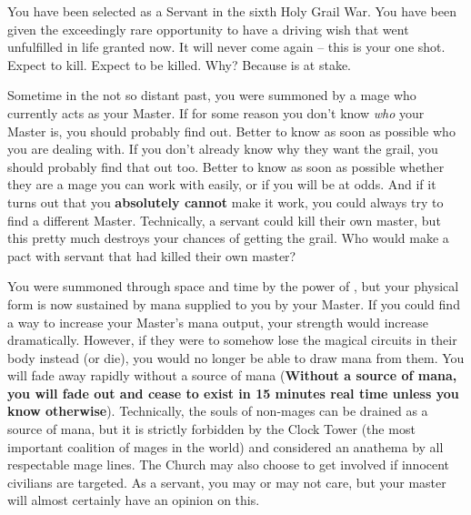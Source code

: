 \documentclass[blue]{FateDarkDawn}
\begin{document}
\name{\bServant{}}

You have been selected as a Servant in the sixth Holy Grail War. You have been given the exceedingly rare opportunity to have a driving wish that went unfulfilled in life granted now. It will never come again -- this is your one shot. Expect to kill. Expect to be killed. Why? Because \iGrail{} is at stake.

Sometime in the not so distant past, you were summoned by a mage who currently acts as your Master. If for some reason you don't know \emph{who} your Master is, you should probably find out. Better to know as soon as possible who you are dealing with. If you don't already know why they want the grail, you should probably find that out too. Better to know as soon as possible whether they are a mage you can work with easily, or if you will be at odds. And if it turns out that you {\bf absolutely cannot} make it work, you could always try to find a different Master. Technically, a servant could kill their own master, but this pretty much destroys your chances of getting the grail. Who would make a pact with servant that had killed their own master?

You were summoned through space and time by the power of \iGrail{\MYname}, but your physical form is now sustained by mana supplied to you by your Master. If you could find a way to increase your Master's mana output, your strength would increase dramatically. However, if they were to somehow lose the magical circuits in their body instead (or die), you would no longer be able to draw mana from them. You will fade away rapidly without a source of mana ({\bf Without a source of mana, you will  fade out and cease to exist in 15 minutes real time unless you know otherwise}). Technically, the souls of non-mages can be drained as a source of mana, but it is strictly forbidden by the Clock Tower (the most important coalition of mages in the world) and considered an anathema by all respectable mage lines. The Church may also choose to get involved if innocent civilians are  targeted. As a servant, you may or may not care, but your master will almost certainly have an opinion on this.
\end{document}
